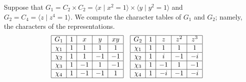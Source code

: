 \begin{exmp}{}
    Suppose that $G_1 = C_2 \times C_2 = \langle x \mid x^2 = 1 \rangle 
    \times \langle y \mid y^2 = 1 \rangle$ and $G_2 = C_4 = \langle z \mid 
    z^4 = 1 \rangle$. We compute the character tables of $G_1$ and $G_2$; 
    namely, the characters of the representations. 
    \begin{align*}
        \begin{array}{|c|c|c|c|c|}
            \hline
            G_1    & 1 & x  & y  & xy \\ \hline
            \chi_1 & 1 & 1  & 1  & 1  \\ \hline
            \chi_2 & 1 & 1  & -1 & -1 \\ \hline
            \chi_3 & 1 & -1 & 1  & -1 \\ \hline
            \chi_4 & 1 & -1 & -1 & 1  \\ \hline
        \end{array} & & 
        \begin{array}{|c|c|c|c|c|}
            \hline
            G_2    & 1 & z  & z^2  & z^3 \\ \hline
            \chi_1 & 1 & 1  & 1    & 1  \\ \hline
            \chi_2 & 1 & i  & -1   & -i \\ \hline
            \chi_3 & 1 & -1 & 1    & -1 \\ \hline
            \chi_4 & 1 & -i & -1   & -i  \\ \hline
        \end{array} 
    \end{align*}
\end{exmp}

